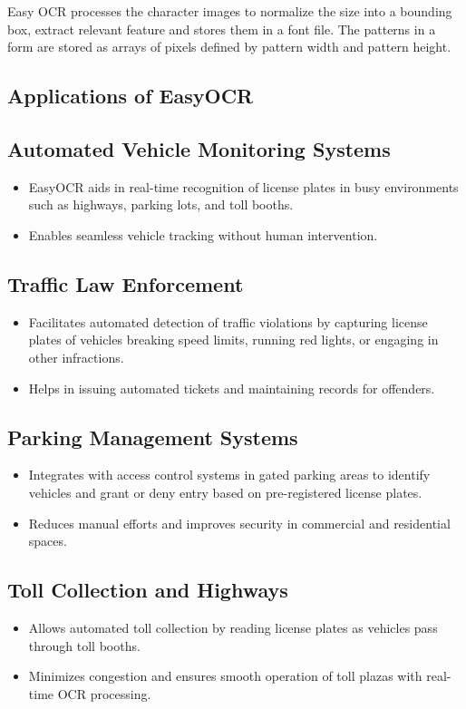 Easy OCR processes the character images to normalize the size into a bounding box, extract relevant feature and stores them in a font file. The patterns in a form are stored as arrays of pixels defined by pattern width and pattern height.

\subsection{Applications of EasyOCR}

\subsection*{Automated Vehicle Monitoring Systems} 

\begin{itemize}
	\item EasyOCR aids in real-time recognition of license plates in busy environments such as highways, parking lots, and toll booths.
	\item Enables seamless vehicle tracking without human intervention.
\end{itemize}
\subsection*{Traffic Law Enforcement}
\begin{itemize}
\item Facilitates automated detection of traffic violations by capturing license plates of vehicles breaking speed limits, running red lights, or engaging in other infractions.
\item Helps in issuing automated tickets and maintaining records for offenders.
\end{itemize}
\subsection*{Parking Management Systems}
\begin{itemize}
\item Integrates with access control systems in gated parking areas to identify vehicles and grant or deny entry based on pre-registered license plates.
\item Reduces manual efforts and improves security in commercial and residential spaces.
\end{itemize}
\subsection*{Toll Collection and Highways}
\begin{itemize}
\item Allows automated toll collection by reading license plates as vehicles pass through toll booths.
\item Minimizes congestion and ensures smooth operation of toll plazas with real-time OCR processing.

\end{itemize}

